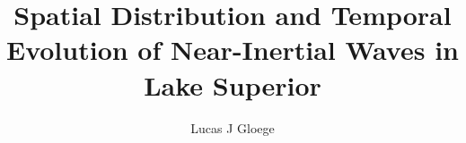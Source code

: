 
           \ms          	%

\title{\bf Spatial Distribution and Temporal Evolution of Near-Inertial Waves in Lake Superior}
\author{Lucas J Gloege}


\abstract{}
\copyrightpage   %
\acknowledgements{}


 \beforepreface 

\figurespage
\tablespage

\afterpreface            

